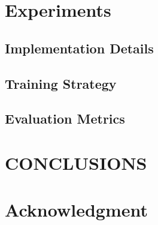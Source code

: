 \documentclass[conference]{IEEEtran}
\begin{document}
\section{Experiments}
\subsection{Implementation Details}
\subsection{Training Strategy}
\subsection{Evaluation Metrics}

\section{CONCLUSIONS}
\section*{Acknowledgment}



\end{document}
